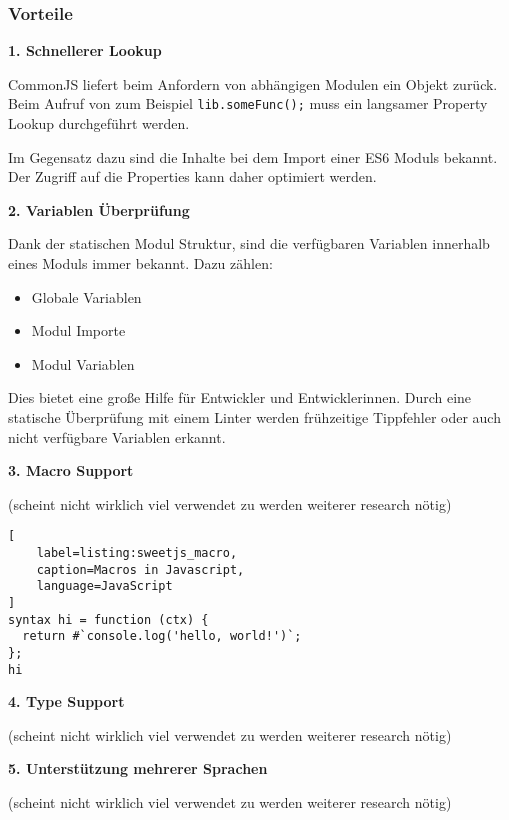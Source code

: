 \subsubsection{Vorteile}

\textbf{1. Schnellerer Lookup}

CommonJS liefert beim Anfordern von abhängigen Modulen ein Objekt zurück. Beim Aufruf von zum Beispiel \lstinline{lib.someFunc();} muss ein langsamer Property Lookup durchgeführt werden.

Im Gegensatz dazu sind die Inhalte bei dem Import einer ES6 Moduls bekannt. Der Zugriff auf die Properties kann daher optimiert werden. \autocite{AxelRauschmayer2014}

\bigskip

\textbf{2. Variablen Überprüfung}

Dank der statischen Modul Struktur, sind die verfügbaren Variablen innerhalb eines Moduls immer bekannt. Dazu zählen:
\begin{itemize}
\item Globale Variablen
\item Modul Importe
\item Modul Variablen
\end{itemize}
Dies bietet eine große Hilfe für Entwickler und Entwicklerinnen. Durch eine statische Überprüfung mit einem Linter werden frühzeitige Tippfehler oder auch nicht verfügbare Variablen erkannt.\autocite{AxelRauschmayer2014}

\bigskip

\textbf{3. Macro Support}

(scheint nicht wirklich viel verwendet zu werden weiterer research nötig)

\begin{lstlisting}[
    label=listing:sweetjs_macro,
    caption=Macros in Javascript,
	language=JavaScript
]
syntax hi = function (ctx) {
  return #`console.log('hello, world!')`;
};
hi
\end{lstlisting}



\bigskip

\textbf{4. Type Support}

(scheint nicht wirklich viel verwendet zu werden weiterer research nötig)

\bigskip

\textbf{5. Unterstützung mehrerer Sprachen}

(scheint nicht wirklich viel verwendet zu werden weiterer research nötig)

